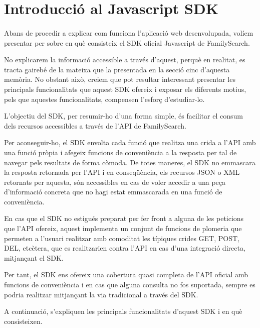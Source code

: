 \section{Introducció al Javascript SDK}

    \paragraph{}
    Abans de procedir a explicar com funciona l'aplicació web desenvolupada, volíem presentar per sobre en què consisteix el SDK oficial Javascript de FamilySearch.

    No explicarem la informació accessible a través d'aquest, perquè en realitat, es tracta gairebé de la mateixa que la presentada en la secció cinc d'aquesta memòria. No obstant això, creiem que pot resultar interessant presentar les principals funcionalitats que aquest SDK ofereix i exposar els diferents motius, pels que aquestes funcionalitats, compensen l’esforç d’estudiar-lo.

    L’objectiu del SDK, per resumir-ho d’una forma simple, és facilitar el consum dels recursos accessibles a través de l'API de FamilySearch.

    Per aconseguir-ho, el SDK envolta cada funció que realitza una crida a l’API amb una funció pròpia i afegeix funcions de conveniència a la resposta per tal de navegar pels resultats de forma còmoda. De totes maneres, el SDK no emmascara la resposta retornada per l’API i en conseqüència, els recursos JSON o XML retornats per aquesta, són accessibles en cas de voler accedir a una peça d'informació concreta que no hagi estat emmascarada en una funció de conveniència.

    En cas que el SDK no estigués preparat per fer front a alguna de les peticions que l’API ofereix, aquest implementa un conjunt de funcions de plomeria que permeten a l'usuari realitzar amb comoditat les típiques crides GET, POST, DEL, etcètera, que es realitzarien contra l’API en cas d’una integració directa, mitjançant el SDK.

    Per tant, el SDK ens ofereix una cobertura quasi completa de l’API oficial amb funcions de conveniència i en cas que alguna consulta no fos suportada, sempre es podria realitzar mitjançant la via tradicional a través del SDK.

    A continuació, s'expliquen les principals funcionalitats d'aquest SDK i en què consisteixen.
